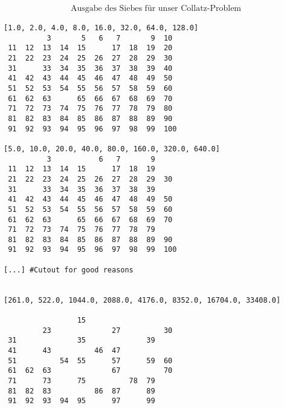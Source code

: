 \documentclass{article}
\begin{document}
\begin{gather*}
\text {Ausgabe des Siebes für unser Collatz-Problem}
\end{gather*}
\begin{verbatim}
[1.0, 2.0, 4.0, 8.0, 16.0, 32.0, 64.0, 128.0]
          3       5   6   7       9  10 
 11  12  13  14  15      17  18  19  20 
 21  22  23  24  25  26  27  28  29  30 
 31      33  34  35  36  37  38  39  40 
 41  42  43  44  45  46  47  48  49  50 
 51  52  53  54  55  56  57  58  59  60 
 61  62  63      65  66  67  68  69  70 
 71  72  73  74  75  76  77  78  79  80 
 81  82  83  84  85  86  87  88  89  90 
 91  92  93  94  95  96  97  98  99  100 

[5.0, 10.0, 20.0, 40.0, 80.0, 160.0, 320.0, 640.0]
          3           6   7       9     
 11  12  13  14  15      17  18  19     
 21  22  23  24  25  26  27  28  29  30 
 31      33  34  35  36  37  38  39     
 41  42  43  44  45  46  47  48  49  50 
 51  52  53  54  55  56  57  58  59  60 
 61  62  63      65  66  67  68  69  70 
 71  72  73  74  75  76  77  78  79     
 81  82  83  84  85  86  87  88  89  90 
 91  92  93  94  95  96  97  98  99  100 

[...] #Cutout for good reasons


[261.0, 522.0, 1044.0, 2088.0, 4176.0, 8352.0, 16704.0, 33408.0]
                                        
                 15                     
         23              27          30 
 31              35              39     
 41      43          46  47             
 51          54  55      57      59  60 
 61  62  63              67          70 
 71      73      75          78  79     
 81  82  83          86  87      89     
 91  92  93  94  95      97      99     
\end{verbatim}

\newpage
\end{document}
